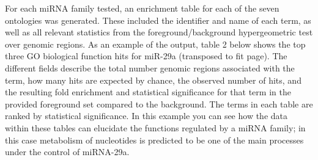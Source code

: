 \documentclass[12pt]{article}
\begin{document}
For each miRNA family tested, an enrichment table for each of the seven ontologies was generated. These included the identifier and name of each term, as well as all relevant statistics from the foreground/background hypergeometric test over genomic regions. As an example of the output, table 2 below shows the top three GO biological function hits for miR-29a (transposed to fit page). The different fields describe the total number genomic regions associated with the term, how many hits are expected by chance, the observed number of hits, and the resulting fold enrichment and statistical significance for that term in the provided foreground set compared to the background. The terms in each table are ranked by statistical significance. In this example you can see how the data within these tables can elucidate the functions regulated by a miRNA family; in this case metabolism of nucleotides is predicted to be one of the main processes under the control of miRNA-29a.
\end{document}
